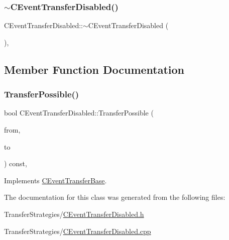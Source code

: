 \subsubsection{\texorpdfstring{$\sim$\+C\+Event\+Transfer\+Disabled()}{~CEventTransferDisabled()}}
{\footnotesize\ttfamily C\+Event\+Transfer\+Disabled\+::$\sim$\+C\+Event\+Transfer\+Disabled (\begin{DoxyParamCaption}{ }\end{DoxyParamCaption})\hspace{0.3cm}{\ttfamily [inline]}, {\ttfamily [override]}}



\subsection{Member Function Documentation}
\mbox{\label{class_c_event_transfer_disabled_a5015ce168c3fcba4a20381256f901c3a}} 
\subsubsection{\texorpdfstring{Transfer\+Possible()}{TransferPossible()}}
{\footnotesize\ttfamily bool C\+Event\+Transfer\+Disabled\+::\+Transfer\+Possible (\begin{DoxyParamCaption}\item[{const \mbox{\hyperlink{class_c_date}{C\+Date}} \&}]{from,  }\item[{const \mbox{\hyperlink{class_c_date}{C\+Date}} \&}]{to }\end{DoxyParamCaption}) const\hspace{0.3cm}{\ttfamily [override]}, {\ttfamily [virtual]}}



Implements \mbox{\hyperlink{class_c_event_transfer_base_aa72518d8ee05349865216c8e60459669}{C\+Event\+Transfer\+Base}}.



The documentation for this class was generated from the following files\+:\begin{DoxyCompactItemize}
\item 
Transfer\+Strategies/\mbox{\hyperlink{_c_event_transfer_disabled_8h}{C\+Event\+Transfer\+Disabled.\+h}}\item 
Transfer\+Strategies/\mbox{\hyperlink{_c_event_transfer_disabled_8cpp}{C\+Event\+Transfer\+Disabled.\+cpp}}\end{DoxyCompactItemize}
